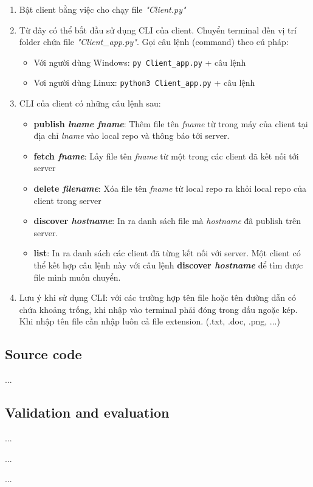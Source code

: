 \documentclass[a4paper]{article}
\begin{document}
	\begin{enumerate}
		\item Bật client bằng việc cho chạy file \textit{"Client.py"}
		\item Từ đây có thể bắt đầu sử dụng CLI của client. Chuyển terminal đến vị trí folder chứa file \textit{"Client\_app.py"}. Gọi câu lệnh (command) theo cú pháp:
		\begin{itemize}
			\item Với người dùng Windows: \texttt{py Client\_app.py} + câu lệnh
			\item Vơi người dùng Linux: \texttt{python3 Client\_app.py} + câu lệnh
		\end{itemize}
		\item CLI của client có những câu lệnh sau:
		\begin{itemize}
			\item \textbf{publish \textit{lname fname}}: Thêm file tên \textit{fname} từ trong máy của client tại địa chỉ \textit{lname} vào local repo và thông báo tới server.
			\item \textbf{fetch \textit{fname}}: Lấy file tên \textit{fname} từ một trong các client đã kết nối tới server
			\item \textbf{delete \textit{filename}}: Xóa file tên \textit{fname} từ local repo ra khỏi local repo của client trong server
			\item \textbf{discover \textit{hostname}}: In ra danh sách file mà \textit{hostname} đã publish trên server.
			\item \textbf{list}: In ra danh sách các client đã từng kết nối với server. Một client có thể kết hợp câu lệnh này với câu lệnh \textbf{discover \textit{hostname}} để tìm được file mình muốn chuyển.
		\end{itemize}
		\item Lưu ý khi sử dụng CLI: với các trường hợp tên file hoặc tên đường dẫn có chứa khoảng trống, khi nhập vào terminal phải đóng trong dấu ngoặc kép. Khi nhập tên file cần nhập luôn cả file extension. (.txt, .doc, .png, ...)
	\end{enumerate}
	\subsection{Source code}
	...
	
	\subsection{Validation and evaluation}
	...
	
	\begin{thebibliography}{80}
		
		
		...
		
		
		...
		
		
	\end{thebibliography}
\end{document}
